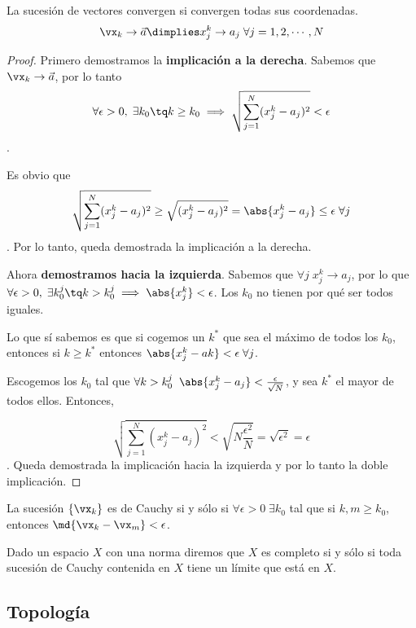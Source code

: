 \documentclass[12pt,a4paper,titlepage]{apuntes}
\begin{document}
\begin{theorem} La sucesión de vectores convergen si convergen todas sus coordenadas.
\[\vx_k \to \vec{a} \dimplies x_j^k\to a_j \;\forall j = 1,2,\cdots, N\]
\end{theorem}

\begin{proof}
Primero demostramos la \textbf{implicación a la derecha}. Sabemos que $\vx_k\to\vec{a}$, por lo tanto $$\forall \epsilon > 0,\; \exists k_0 \tq k\geq k_0 \implies \sqrt{\sum_{j=1}^N(x_j^k-a_j)^2}<\epsilon$$.

Es obvio que \[\sqrt{\sum_{j=1}^N(x_j^k-a_j)^2}\geq \sqrt{(x_j^k-a_j)^2} = \abs{x_j^k-a_j}\leq \epsilon \;\forall j\]. Por lo tanto, queda demostrada la implicación a la derecha.

Ahora \textbf{demostramos hacia la izquierda}. Sabemos que $\forall j\; x_j^k \to a_j$, por lo que $\forall \epsilon > 0,\; \exists k_0^j \tq k>k_0^j \implies \abs{x_j^k} < \epsilon$. Los $k_0$ no tienen por qué ser todos iguales. 

Lo que sí sabemos es que si cogemos un $k^*$ que sea el máximo de todos los $k_0$, entonces si $k\geq k^*$ entonces $\abs{x_j^k-ak}<\epsilon\; \forall j$. 

Escogemos los $k_0$ tal que $\forall k > k_0^j\;\; \abs{x_j^k-a_j}<\frac{\epsilon}{\sqrt{N}}$, y sea $k^*$ el mayor de todos ellos. Entonces, 

\[\sqrt{\sum_{j=1}^N(x_j^k-a_j)^2} < \sqrt{N\frac{\epsilon^2}{N}} = \sqrt{\epsilon^2}=\epsilon\]. Queda demostrada la implicación hacia la izquierda y por lo tanto la doble implicación.
\end{proof}

\begin{defn}
La sucesión $\{\vx_k\}$ es de Cauchy si y sólo si $\forall \epsilon > 0 \; \exists k_0$ tal que si $k,m \geq k_0$, entonces $\md{\vx_k-\vx_m}<\epsilon$.
\end{defn}

\begin{defn} Dado un espacio $X$ con una norma diremos que $X$ es completo si y sólo si toda sucesión de Cauchy contenida en $X$ tiene un límite que está en $X$.\end{defn}

\subsection{Topología}
\end{document}
